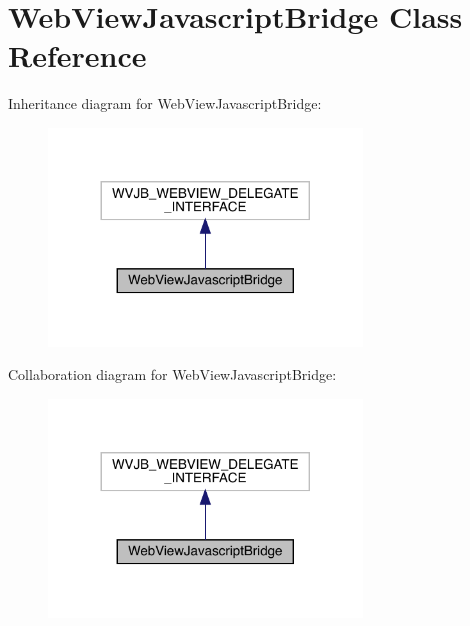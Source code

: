 \hypertarget{interface_web_view_javascript_bridge}{}\section{Web\+View\+Javascript\+Bridge Class Reference}
\label{interface_web_view_javascript_bridge}


Inheritance diagram for Web\+View\+Javascript\+Bridge\+:\nopagebreak
\begin{figure}[H]
\begin{center}
\leavevmode
\includegraphics[width=236pt]{interface_web_view_javascript_bridge__inherit__graph}
\end{center}
\end{figure}


Collaboration diagram for Web\+View\+Javascript\+Bridge\+:\nopagebreak
\begin{figure}[H]
\begin{center}
\leavevmode
\includegraphics[width=236pt]{interface_web_view_javascript_bridge__coll__graph}
\end{center}
\end{figure}

